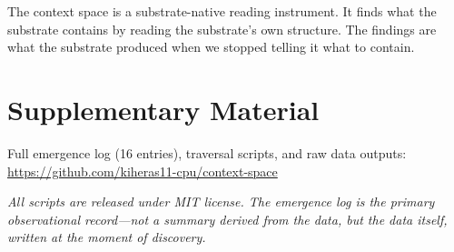 \documentclass[11pt]{article}
\begin{document}
The context space is a substrate-native reading instrument. It finds what the substrate contains by reading the substrate's own structure. The findings are what the substrate produced when we stopped telling it what to contain.

\section*{Supplementary Material}

Full emergence log (16 entries), traversal scripts, and raw data outputs:\\
\url{https://github.com/kiheras11-cpu/context-space}

\textit{All scripts are released under MIT license. The emergence log is the primary observational record---not a summary derived from the data, but the data itself, written at the moment of discovery.}
\end{document}
